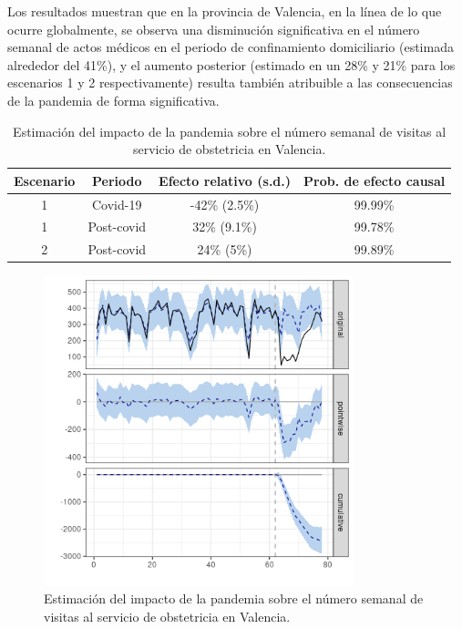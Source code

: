 \documentclass[12pt,twoside]{article} %
\begin{document}
Los resultados muestran que en la provincia de Valencia, en la línea de lo que ocurre globalmente, se observa una disminución significativa en el número semanal de actos médicos en el periodo de confinamiento domiciliario (estimada alrededor del 41\%), y el aumento posterior (estimado en un 28\% y 21\% para los escenarios 1 y 2 respectivamente) resulta también atribuible a las consecuencias de la pandemia de forma significativa.

\begin{table}[H]\caption{Estimación del impacto de la pandemia sobre el número semanal de visitas al servicio de obstetricia en Valencia.}
    \centering
      \begin{tabular}{ |c|c|c|c| }
          \hline
          \textbf{Escenario} & \textbf{Periodo} & \textbf{Efecto relativo (s.d.)} & \textbf{Prob. de efecto causal} \\ 
          \hline
       1 & Covid-19 & -42\% (2.5\%) & 99.99\% \\  
       1 & Post-covid & 32\% (9.1\%) & 99.78\% \\
       \hline   
       2 & Post-covid & 24\% (5\%) & 99.89\% \\
       \hline
      \end{tabular}
    \end{table}
    
    \begin{center}
      \begin{figure}[H]
        \includegraphics[width=9cm]{obstetrics_covid_Valencia.png}\caption{Estimación del impacto de la pandemia sobre el número semanal de visitas al servicio de obstetricia en Valencia.}
      \end{figure}
      \end{center}
      
\end{document}
